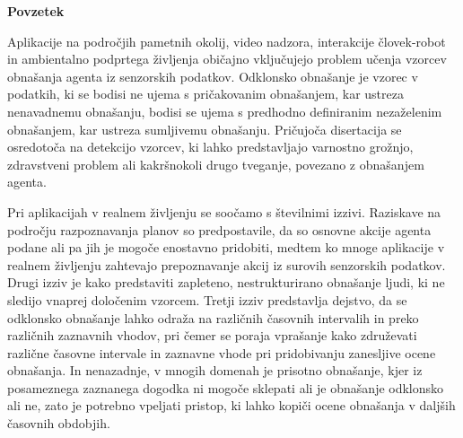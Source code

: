 

  \cleardoublepage
  \thispagestyle{fancy}
  \fancyhead{}
  \fancyfoot{}
  \fancyhead[RO]{\thepage}
  \fancyhead[LO]{}
  \fancyhead[LE]{\thepage}
  \vspace{-2.4cm} 
  {\noindent \Large \bfseries Povzetek}
  \vspace{1.5cm}

\vspace{-1mm}
\noindent
Aplikacije na podro{\v c}jih pametnih okolij, video nadzora, interakcije {\v c}lovek-robot in ambientalno podprtega {\v z}ivljenja obi{\v c}ajno vklju{\v c}ujejo problem u{\v c}enja vzorcev obna{\v s}anja agenta iz senzorskih podatkov. Odklonsko obna{\v s}anje je vzorec v podatkih, ki se bodisi ne ujema s pri{\v c}akovanim obna{\v s}anjem, kar ustreza nenavadnemu obna{\v s}anju, bodisi se ujema s predhodno definiranim neza{\v z}elenim obna{\v s}anjem, kar ustreza sumljivemu obna{\v s}anju. Pri{\v c}ujo{\v c}a disertacija se osredoto{\v c}a na detekcijo vzorcev, ki lahko predstavljajo varnostno gro{\v z}njo, zdravstveni problem ali kakr{\v s}nokoli drugo tveganje, povezano z obna{\v s}anjem agenta. 


Pri aplikacijah v realnem {\v z}ivljenju se soo{\v c}amo s {\v s}tevilnimi izzivi. Raziskave na podro{\v c}ju razpoznavanja planov so predpostavile, da so osnovne akcije agenta podane ali pa jih je mogo{\v c}e enostavno pridobiti, medtem ko mnoge aplikacije v realnem {\v z}ivljenju zahtevajo prepoznavanje akcij iz surovih senzorskih podatkov. Drugi izziv je kako predstaviti zapleteno, nestrukturirano obna{\v s}anje ljudi, ki ne sledijo vnaprej dolo{\v c}enim vzorcem. Tretji izziv predstavlja dejstvo, da se odklonsko obna{\v s}anje lahko odra{\v z}a na razli{\v c}nih {\v c}asovnih intervalih in preko razli{\v c}nih zaznavnih vhodov, pri {\v c}emer se poraja vpra{\v s}anje kako zdru{\v z}evati razli{\v c}ne {\v c}asovne intervale in zaznavne vhode pri pridobivanju zanesljive ocene obna{\v s}anja. In nenazadnje, v mnogih domenah je prisotno obna{\v s}anje, kjer iz posameznega zaznanega dogodka ni mogo{\v c}e sklepati ali je obna{\v s}anje odklonsko ali ne, zato je potrebno vpeljati pristop, ki lahko kopi{\v c}i ocene obna{\v s}anja v dalj{\v s}ih {\v c}asovnih obdobjih. 


